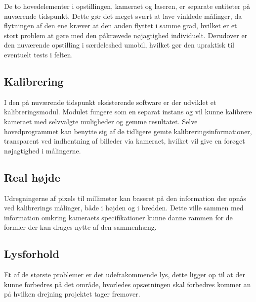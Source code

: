 De to hovedelementer i opstillingen, kameraet og laseren, er separate entiteter på nuværende tidspunkt. Dette gør det meget svært at lave vinklede målinger, da flytningen af den ene kræver at den anden flyttet i samme grad, hvilket er et stort problem at gøre med den påkrævede nøjagtighed individuelt. Derudover er den nuværende opstilling i særdeleshed umobil, hvilket gør den upraktisk til eventuelt tests i felten.

\subsection{Kalibrering}

I den på nuværende tidspunkt eksisterende software er der udviklet et kalibreringsmodul. Modulet fungere som en separat instans og vil kunne kalibrere kameraet med selvvalgte muligheder og gemme resultatet.
Selve hovedprogrammet kan benytte sig af de tidligere gemte kalibreringsinformationer, transparent ved indhentning af billeder via kameraet, hvilket vil give en forøget nøjagtighed i målingerne.

\subsection{Real højde}

Udregningerne af pixels til millimeter kan baseret på den information der opnås ved kalibrerings målinger, både i højden og i bredden. Dette ville sammen med information omkring kameraets specifikationer kunne danne rammen for de formler der kan drages nytte af den sammenhæng.

\subsection{Lysforhold}

Et af de største problemer er det udefrakommende lys, dette ligger op til at der kunne forbedres på det område, hvorledes opsætningen skal forbedres kommer an på hvilken drejning projektet tager fremover.
